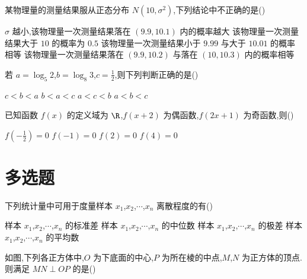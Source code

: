 \begin{problem}
某物理量的测量结果服从正态分布 \(N\left( 10,\sigma^2 \right)\),下列结论中不正确的是(\quad)

\choices
    {\(\sigma\) 越小,该物理量一次测量结果落在 \(\left( 9.9,10.1 \right)\) 内的概率越大}
    {该物理量一次测量结果大于 \(10\) 的概率为 \(0.5\)}
    {该物理量一次测量结果小于 \(9.99\) 与大于 \(10.01\) 的概率相等}
    {该物理量一次测量结果落在 \(\left( 9.9,10.2 \right)\) 与落在 \(\left( 10,10.3 \right)\) 内的概率相等}

\end{problem}


\begin{problem}
若 \(a=\log_5 2\),\(b=\log_8 3\),\(c=\frac12\),则下列判断正确的是(\quad)

\choices
    {\(c<b<a\)}
    {\(b<a<c\)}
    {\(a<c<b\)}
    {\(a<b<c\)}

\end{problem}


\begin{problem}
已知函数 \(f\left( x \right)\) 的定义域为 \(\R\),\(f\left( x+2 \right)\) 为偶函数,\(f\left( 2x+1 \right)\) 为奇函数,则(\quad)

\choices
    {\(f\left( -\frac12 \right)=0\)}
    {\(f\left( -1 \right)=0\)}
    {\(f\left( 2 \right)=0\)}
    {\(f\left( 4 \right)=0\)}

\end{problem}

\section{多选题}

\begin{problem}
下列统计量中可用于度量样本 \(x_1\),\(x_2\),\(\cdots\),\(x_n\) 离散程度的有(\quad)

\choices
    {样本 \(x_1\),\(x_2\),\(\cdots\),\(x_n\) 的标准差}
    {样本 \(x_1\),\(x_2\),\(\cdots\),\(x_n\) 的中位数}
    {样本 \(x_1\),\(x_2\),\(\cdots\),\(x_n\) 的极差}
    {样本 \(x_1\),\(x_2\),\(\cdots\),\(x_n\) 的平均数}

\end{problem}


\begin{problem}
如图,下列各正方体中,\(O\) 为下底面的中心,\(P\) 为所在棱的中点,\(M\),\(N\) 为正方体的顶点. 则满足 \(MN\perp OP\) 的是(\quad)

\choices
    {}
    {}
    {}
    {}

\end{problem}


